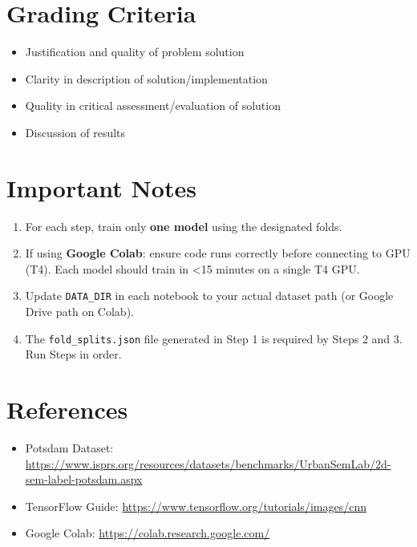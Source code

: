 \documentclass[12pt,a4paper]{article}
\begin{document}
\section{Grading Criteria}

\begin{itemize}
    \item Justification and quality of problem solution
    \item Clarity in description of solution/implementation
    \item Quality in critical assessment/evaluation of solution
    \item Discussion of results
\end{itemize}

\section{Important Notes}

\begin{enumerate}
    \item For each step, train only \textbf{one model} using the designated folds.
    \item If using \textbf{Google Colab}: ensure code runs correctly before connecting to GPU (T4).
          Each model should train in \textless 15 minutes on a single T4 GPU.
    \item Update \texttt{DATA\_DIR} in each notebook to your actual dataset path
          (or Google Drive path on Colab).
    \item The \texttt{fold\_splits.json} file generated in Step 1 is required by Steps 2 and 3.
          Run Steps in order.
\end{enumerate}

\section*{References}
\begin{itemize}
    \item Potsdam Dataset: \url{https://www.isprs.org/resources/datasets/benchmarks/UrbanSemLab/2d-sem-label-potsdam.aspx}
    \item TensorFlow Guide: \url{https://www.tensorflow.org/tutorials/images/cnn}
    \item Google Colab: \url{https://colab.research.google.com/}
\end{itemize}
\end{document}
